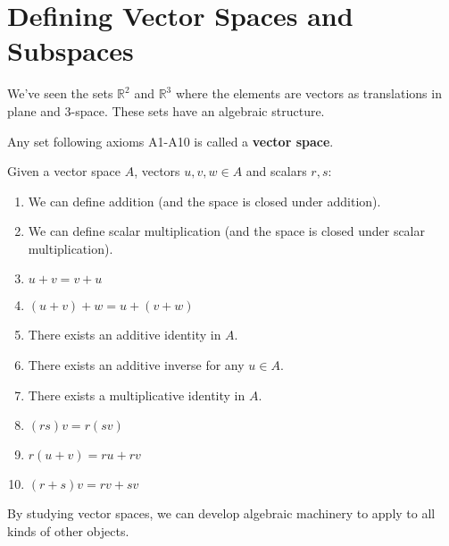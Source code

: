 \documentclass[../main.tex]{subfiles}
\begin{document}
\section{Defining Vector Spaces and Subspaces}

We've seen the sets \( \mathbb{R}^2 \) and \( \mathbb{R}^3 \)
where the elements are vectors as translations in plane and 3-space.
These sets have an algebraic structure.

\begin{definition}
    Any set following axioms A1-A10 is called a \textbf{vector space}.

    Given a vector space \( A \), vectors \( u,v,w \in A \) and scalars \( r,s \):
    \begin{enumerate}[label=A\arabic*.]
        \item We can define addition (and the space is closed under addition).
        \item We can define scalar multiplication (and the space is closed under scalar multiplication).
        \item \( u+v = v+u \)
        \item \( (u+v)+w = u+(v+w) \)
        \item There exists an additive identity in \( A \).
        \item There exists an additive inverse for any \( u \in A \).
        \item There exists a multiplicative identity in \( A \).
        \item \( (rs)v = r(sv) \)
        \item \( r(u+v) = ru + rv \)
        \item \( (r+s)v = rv + sv \)
    \end{enumerate}
\end{definition}

By studying vector spaces, we can develop algebraic machinery to apply to all kinds of other objects.
\end{document}
